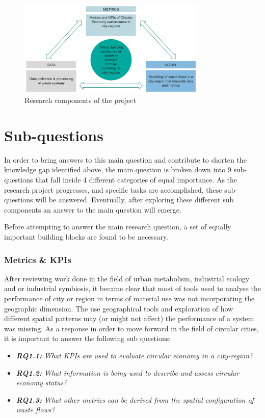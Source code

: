 \begin{figure}[h!]
    \centering
    \includegraphics[width=0.8\textwidth]{sections/asset/blocks.PNG}
    \caption{Research components of the project}
    \label{fig:research_bloacks}
\end{figure}



\section{Sub-questions}
In order to bring answers to this main question and contribute to shorten the knowledge gap identified above, the main question is broken down into 9 sub-questions that fall inside 4 different categories of equal importance. As the research project progresses, and specific tasks are accomplished, these sub-questions will be answered. Eventually, after exploring these different sub components an answer to the main question will emerge. \par
Before attempting to answer the main research question,  a set of equally important building blocks are found to be necessary.

\subsubsection{Metrics \& KPIs}
    After reviewing work done in the field of urban metabolism, industrial ecology and or industrial symbiosis, it became clear that most of tools used to analyse the performance of city or region in terms of material use was not incorporating the geographic dimension. The use geographical tools and exploration of how different spatial patterns may (or might not affect) the performance of a system was missing. As a response in order to move forward in the field of circular cities, it is important to answer the following sub questions:\par
    
    \begin{itemize}
        \item \textit{\textbf{RQ1.1: }What KPIs are used to evaluate circular economy in a city-region?}
        \item \textit{\textbf{RQ1.2: }What information is being used to describe and assess circular economy status?}
        \item \textit{\textbf{RQ1.3: }What other metrics can be derived from the spatial configuration of waste flows?}
    \end{itemize}
    

